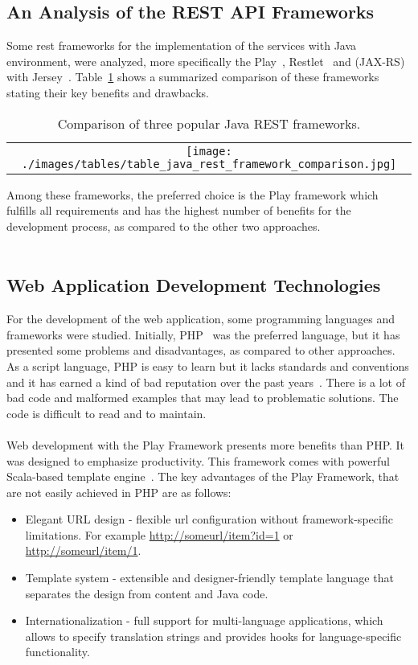 \subsection{An Analysis of the REST API Frameworks}
Some \gls{rest} frameworks for the implementation of the services with Java environment, were analyzed, more specifically the Play~\cite{playFramework}, Restlet~\cite{restletFramework} and (JAX-RS) with Jersey~\cite{jaxRsJerseyExamples}\cite{jaxrsFramework}. Table~\ref{tab:javaRestComparison} shows a summarized comparison of these frameworks stating their key benefits and drawbacks.
\begin{center}
\begin{table}
    \caption{Comparison of three popular Java REST frameworks.} 
    \label{tab:javaRestComparison}
    \begin{tabular}{c}
	\texttt{[image: ./images/tables/table\_java\_rest\_framework\_comparison.jpg]}    
    \end{tabular}
    \end{table}
\end{center}
Among these frameworks, the preferred choice is the Play framework which fulfills all requirements and has the highest number of benefits for the development process, as compared to the other two approaches.\\
\\  
\subsection{Web Application Development Technologies}
For the development of the web application, some programming languages and frameworks were studied. Initially, PHP~\cite{php} was the preferred language, but it has presented some problems and disadvantages, as compared to other approaches. As a script language, PHP is easy to learn but it lacks standards and conventions and it has earned a kind of bad reputation over the past years~\cite{phpBadReputation}. There is a lot of bad code and malformed examples that may lead to problematic solutions. The code is difficult to read and to maintain.\\
\\
Web development with the Play Framework presents more benefits than PHP. It was designed to emphasize productivity. This framework comes with powerful Scala-based template engine~\cite{playFramework}. The key advantages of the Play Framework, that are not easily achieved in PHP are as follows:
\begin{itemize}
\item Elegant URL design - flexible \gls{url} configuration without framework-specific limitations. For example \url{http://someurl/item?id=1} or \url{http://someurl/item/1}.
\item Template system  - extensible and designer-friendly template language that separates the design from content and Java code.
\item Internationalization - full support for multi-language applications, which allows to specify translation strings and provides hooks for language-specific functionality.
\end{itemize}
